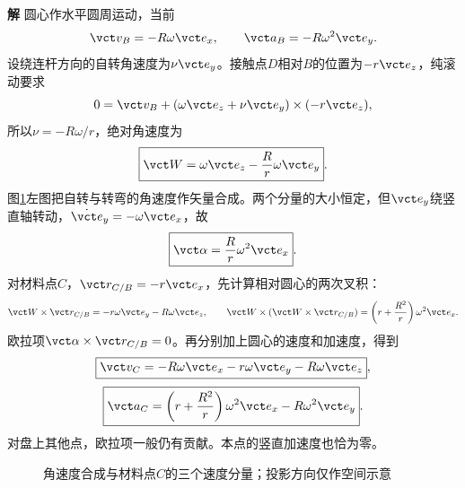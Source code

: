 \documentclass[11pt,openany,fontset=fandol]{ctexbook}
\theoremstyle{definition}\newtheorem{example}{例}[chapter]\newtheorem{exercise}{习题}[chapter]
\newcommand{\SolutionStart}{\par\medskip\ifdim\pagetotal>0pt\ifdim\dimexpr\pagegoal-\pagetotal\relax<3\baselineskip\newpage\fi\fi\noindent\textbf{解}\quad\ignorespaces}
\newenvironment{solution}{\SolutionStart}{\par\medskip}
\begin{document}
\begin{solution}
圆心作水平圆周运动，当前
\[
 \vct v_B=-R\omega\vct e_x,\qquad
 \vct a_B=-R\omega^2\vct e_y.
\]
设绕连杆方向的自转角速度为$\nu\vct e_y$。接触点$D$相对$B$的位置为$-r\vct e_z$，纯滚动要求
\[
 0=\vct v_B+(\omega\vct e_z+\nu\vct e_y)\times(-r\vct e_z),
\]
所以$\nu=-R\omega/r$，绝对角速度为
\[
 \boxed{\vct W=\omega\vct e_z-\frac{R}{r}\omega\vct e_y}.
\]
图\ref{mp3:fig:hw:l3-21-s}左图把自转与转弯的角速度作矢量合成。两个分量的大小恒定，但$\vct e_y$绕竖直轴转动，$\dot{\vct e}_y=-\omega\vct e_x$，故
\[
 \boxed{\vct\alpha=\frac{R}{r}\omega^2\vct e_x}.
\]
对材料点$C$，$\vct r_{C/B}=-r\vct e_x$，先计算相对圆心的两次叉积：
\[
\vct W\times\vct r_{C/B}=-r\omega\vct e_y-R\omega\vct e_z,
\qquad
\vct W\times(\vct W\times\vct r_{C/B})
=\left(r+\frac{R^2}{r}\right)\omega^2\vct e_x.
\]
欧拉项$\vct\alpha\times\vct r_{C/B}=0$。再分别加上圆心的速度和加速度，得到
\[
 \boxed{\vct v_C=-R\omega\vct e_x-r\omega\vct e_y
                         -R\omega\vct e_z},
\]
\[
 \boxed{\vct a_C=\left(r+\frac{R^2}{r}\right)\omega^2\vct e_x
                         -R\omega^2\vct e_y}.
\]
对盘上其他点，欧拉项一般仍有贡献。本点的竖直加速度也恰为零。


\begin{figure}[H]\centering
{}
\caption{角速度合成与材料点$C$的三个速度分量；投影方向仅作空间示意}\label{mp3:fig:hw:l3-21-s}
\end{figure}

\end{solution}
\end{document}

